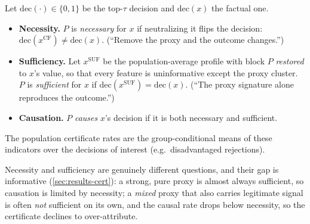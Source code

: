 \documentclass[sn-mathphys-num]{sn-jnl}
\newcommand{\xcf}{x^{\mathrm{CF}}}
\newcommand{\xsuf}{x^{\mathrm{SUF}}}
\begin{document}
\begin{definition}
\label{def:cert}
Let $\mathrm{dec}(\cdot)\in\{0,1\}$ be the top-$\tau$ decision and $\mathrm{dec}(x)$
the factual one.
\begin{itemize}[leftmargin=1.4em,itemsep=0.12em,topsep=0.2em]
  \item \textbf{Necessity.} $P$ is \emph{necessary} for $x$ if neutralizing it
        flips the decision: $\mathrm{dec}(\xcf)\neq\mathrm{dec}(x)$. (``Remove the
        proxy and the outcome changes.'')
  \item \textbf{Sufficiency.} Let $\xsuf$ be the population-average profile with
        block $P$ \emph{restored} to $x$'s value, so that every feature is uninformative
        except the proxy cluster. $P$ is \emph{sufficient} for $x$ if
        $\mathrm{dec}(\xsuf)=\mathrm{dec}(x)$. (``The proxy signature alone
        reproduces the outcome.'')
  \item \textbf{Causation.} $P$ \emph{causes} $x$'s decision if it is both
        necessary and sufficient.
\end{itemize}
The population certificate rates are the group-conditional means of these
indicators over the decisions of interest (e.g.\ disadvantaged rejections).
\end{definition}

\noindent
Necessity and sufficiency are genuinely different questions, and their gap is
informative (\cref{sec:results-cert}): a strong, pure proxy is almost always
sufficient, so causation is limited by necessity; a \emph{mixed} proxy that also
carries legitimate signal is often \emph{not} sufficient on its own, and the
causal rate drops below necessity, so the certificate declines to over-attribute.
\end{document}

